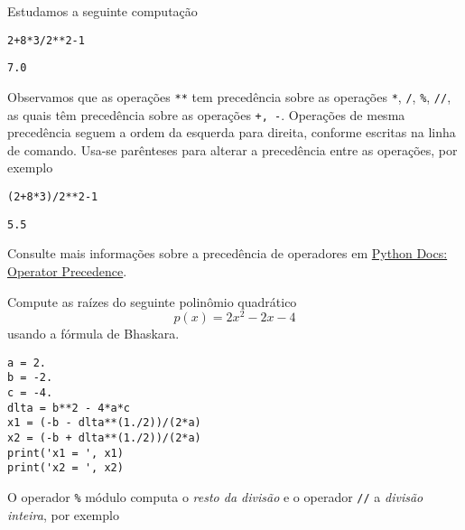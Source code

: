 \begin{ex}
  Estudamos a seguinte computação

\begin{lstlisting}
2+8*3/2**2-1
\end{lstlisting}

\begin{verbatim}
7.0
\end{verbatim}

Observamos que as operações \texttt{**} tem precedência sobre as operações \texttt{*}, \texttt{/}, \texttt{\%}, \texttt{//}, as quais têm precedência sobre as operações \texttt{+, -}. Operações de mesma precedência seguem a ordem da esquerda para direita, conforme escritas na linha de comando. Usa-se parênteses para alterar a precedência entre as operações, por exemplo

\begin{lstlisting}
(2+8*3)/2**2-1
\end{lstlisting}

\begin{verbatim}
5.5
\end{verbatim}

\end{ex}

\begin{obs}
Consulte mais informações sobre a precedência de operadores em \href{https://docs.python.org/3/reference/expressions.html#operator-precedence}{Python Docs: Operator Precedence}.
\end{obs}

\begin{exer}\label{exr:bhaskara}
  Compute as raízes do seguinte polinômio quadrático
  \begin{equation}
    p(x) = 2x^2 - 2x - 4
  \end{equation}
  usando a fórmula de Bhaskara{\bhaskara}.
\end{exer}
\begin{resp}

\begin{lstlisting}
a = 2.
b = -2.
c = -4.
dlta = b**2 - 4*a*c
x1 = (-b - dlta**(1./2))/(2*a)
x2 = (-b + dlta**(1./2))/(2*a)
print('x1 = ', x1)
print('x2 = ', x2)
\end{lstlisting}

\end{resp}

O operador \texttt{\%} módulo computa o \emph{resto da divisão} e o operador \texttt{//} a \emph{divisão inteira}, por exemplo

